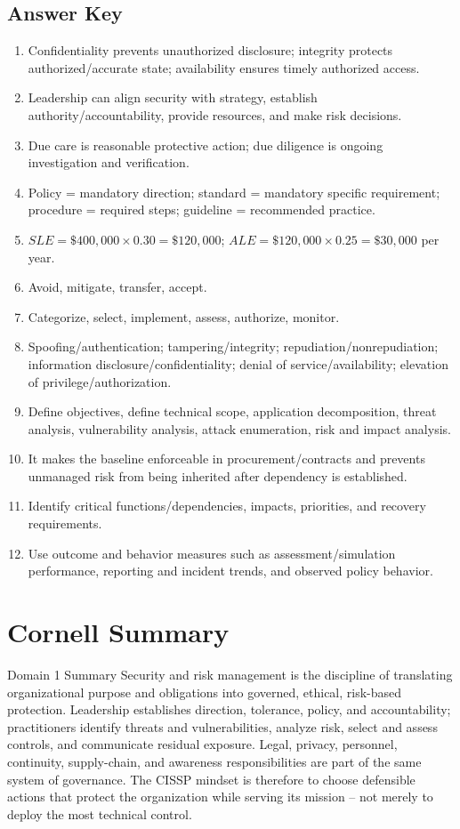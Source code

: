 \documentclass[10pt,letterpaper]{article}
\begin{document}
\subsection*{Answer Key}
\begin{enumerate}
\item Confidentiality prevents unauthorized disclosure; integrity protects authorized/accurate state; availability ensures timely authorized access.
\item Leadership can align security with strategy, establish authority/accountability, provide resources, and make risk decisions.
\item Due care is reasonable protective action; due diligence is ongoing investigation and verification.
\item Policy = mandatory direction; standard = mandatory specific requirement; procedure = required steps; guideline = recommended practice.
\item \(SLE=\$400{,}000\times0.30=\$120{,}000\); \(ALE=\$120{,}000\times0.25=\$30{,}000\) per year.
\item Avoid, mitigate, transfer, accept.
\item Categorize, select, implement, assess, authorize, monitor.
\item Spoofing/authentication; tampering/integrity; repudiation/nonrepudiation; information disclosure/confidentiality; denial of service/availability; elevation of privilege/authorization.
\item Define objectives, define technical scope, application decomposition, threat analysis, vulnerability analysis, attack enumeration, risk and impact analysis.
\item It makes the baseline enforceable in procurement/contracts and prevents unmanaged risk from being inherited after dependency is established.
\item Identify critical functions/dependencies, impacts, priorities, and recovery requirements.
\item Use outcome and behavior measures such as assessment/simulation performance, reporting and incident trends, and observed policy behavior.
\end{enumerate}

\section{Cornell Summary}
\begin{summarybox}{Domain 1 Summary}
Security and risk management is the discipline of translating organizational purpose and obligations into governed, ethical, risk-based protection. Leadership establishes direction, tolerance, policy, and accountability; practitioners identify threats and vulnerabilities, analyze risk, select and assess controls, and communicate residual exposure. Legal, privacy, personnel, continuity, supply-chain, and awareness responsibilities are part of the same system of governance. The CISSP mindset is therefore to choose defensible actions that protect the organization while serving its mission -- not merely to deploy the most technical control.
\end{summarybox}
\end{document}
